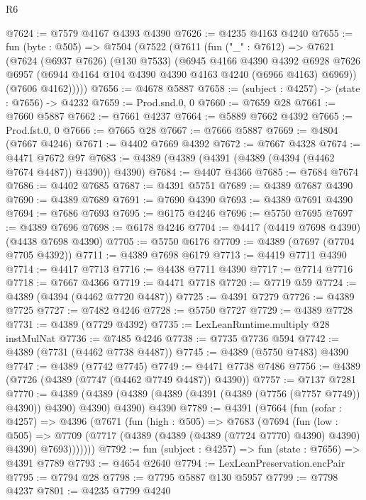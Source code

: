 \begin{lexlean}{R6}
\begin{coremodule}
@7624 := @7579 @4167 @4393 @4390
@7626 := @4235 @4163 @4240
@7655 := fun (byte : @505) =>
  @7504
    (@7522
      (@7611
        (fun ("_" : @7612) =>
        @7621
          (@7624
            (@6937 @7626)
            (@130 @7533)
            (@6945
              @4166
              @4390
              @4392
              @6928
              @7626
              @6957
              (@6944 @4164 @104 @4390 @4390 @4163 @4240 (@6966 @4163) @6969))
            (@7606 @4162)))))
@7656 := @4678 @5887
@7658 := (subject : @4257) -> (state : @7656) -> @4232
@7659 := Prod.snd.{0, 0}
@7660 := @7659 @28
@7661 := @7660 @5887
@7662 := @7661 @4237
@7664 := @5889 @7662 @4392
@7665 := Prod.fst.{0, 0}
@7666 := @7665 @28
@7667 := @7666 @5887
@7669 := @4804 (@7667 @4246)
@7671 := @4402 @7669 @4392
@7672 := @7667 @4328
@7674 := @4471 @7672 @97
@7683 := @4389 (@4389 (@4391 (@4389 (@4394 (@4462 @7674 @4487)) @4390)) @4390)
@7684 := @4407 @4366
@7685 := @7684 @7674
@7686 := @4402 @7685
@7687 := @4391 @5751
@7689 := @4389 @7687 @4390
@7690 := @4389 @7689
@7691 := @7690 @4390
@7693 := @4389 @7691 @4390
@7694 := @7686 @7693
@7695 := @6175 @4246
@7696 := @5750 @7695
@7697 := @4389 @7696
@7698 := @6178 @4246
@7704 := @4417 (@4419 @7698 @4390) (@4438 @7698 @4390)
@7705 := @5750 @6176
@7709 := @4389 (@7697 (@7704 @7705 @4392))
@7711 := @4389 @7698 @6179
@7713 := @4419 @7711 @4390
@7714 := @4417 @7713
@7716 := @4438 @7711 @4390
@7717 := @7714 @7716
@7718 := @7667 @4366
@7719 := @4471 @7718
@7720 := @7719 @59
@7724 := @4389 (@4394 (@4462 @7720 @4487))
@7725 := @4391 @7279
@7726 := @4389 @7725
@7727 := @7482 @4246
@7728 := @5750 @7727
@7729 := @4389 @7728
@7731 := @4389 (@7729 @4392)
@7735 := LexLeanRuntime.multiply @28 instMulNat
@7736 := @7485 @4246
@7738 := @7735 @7736 @594
@7742 := @4389 (@7731 (@4462 @7738 @4487))
@7745 := @4389 (@5750 @7483) @4390
@7747 := @4389 (@7742 @7745)
@7749 := @4471 @7738 @7486
@7756 := @4389 (@7726 (@4389 (@7747 (@4462 @7749 @4487)) @4390))
@7757 := @7137 @7281
@7770 := @4389
    (@4389 (@4389 (@4389 (@4391 (@4389 (@7756 (@7757 @7749)) @4390)) @4390) @4390) @4390)
    @4390
@7789 := @4391
    (@7664
      (fun (sofar : @4257) =>
      @4396
        (@7671
          (fun (high : @505) =>
          @7683
            (@7694
              (fun (low : @505) =>
              @7709 (@7717 (@4389 (@4389 (@4389 (@7724 @7770) @4390) @4390) @4390) @7693)))))))
@7792 := fun (subject : @4257) => fun (state : @7656) => @4391 @7789
@7793 := @4654 @2640
@7794 := LexLeanPreservation.encPair
@7795 := @7794 @28
@7798 := @7795 @5887 @130 @5957
@7799 := @7798 @4237
@7801 := @4235 @7799 @4240

\end{coremodule}
\end{lexlean}
